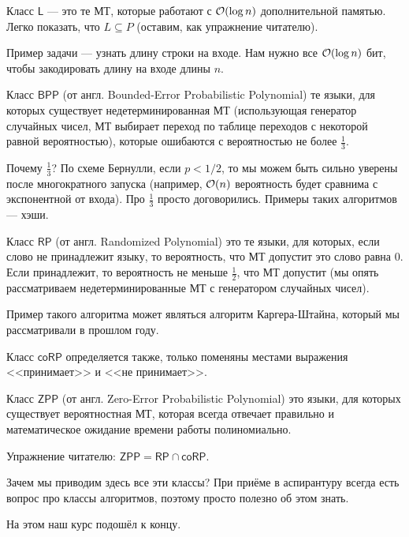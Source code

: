 \documentclass[a4paper, 12pt]{article}
\begin{document}
\begin{Def}
  Класс $\mathsf{L}$ --- это те МТ, которые работают с $\mathcal{O}(\log n)$ дополнительной
  памятью. Легко показать, что $L \subseteq P$ (оставим, как упражнение читателю).
\end{Def}

Пример задачи --- узнать длину строки на входе. Нам нужно все $\mathcal{O}(\log n)$ бит, 
чтобы закодировать длину на входе длины $n$.

\begin{Def}
  Класс $\mathsf{BPP}$ (от англ. Bounded-Error Probabilistic Polynomial) те языки,
  для которых существует
  недетерминированная МТ (использующая генератор случайных чисел, МТ выбирает
  переход по таблице переходов с некоторой равной вероятностью),
  которые ошибаются с вероятностью не более $\frac{1}{3}$.
\end{Def}

Почему $\frac{1}{3}$? По схеме Бернулли, если $p < 1/2$, то мы можем
быть сильно уверены после многократного запуска (например, $\mathcal{O}(n)$ вероятность
будет сравнима с экспонентной от входа). Про
$\frac{1}{3}$ просто договорились. Примеры таких алгоритмов --- хэши.

\begin{Def}
  Класс $\mathsf{RP}$ (от англ. Randomized Polynomial) это те языки, для которых,
  если слово не принадлежит языку, то вероятность, что МТ допустит это слово
  равна 0. Если принадлежит, то вероятность не меньше $\frac{1}{2}$, что МТ
  допустит (мы опять рассматриваем недетерминированные МТ с генератором случайных
  чисел).
\end{Def}

Пример такого алгоритма может являться алгоритм Каргера-Штайна, который мы
рассматривали в прошлом году.

Класс $\mathsf{coRP}$ определяется также, только поменяны местами выражения
<<принимает>> и <<не принимает>>.

\begin{Def}
  Класс $\mathsf{ZPP}$ (от англ. Zero-Error Probabilistic Polynomial) это
  языки, для которых существует вероятностная МТ, которая всегда отвечает
  правильно и математическое ожидание времени работы полиномиально.
\end{Def}

Упражнение читателю: $\mathsf{ZPP} = \mathsf{RP} \cap \mathsf{coRP}$.

Зачем мы приводим здесь все эти классы? При приёме в аспирантуру всегда
есть вопрос про классы алгоритмов, поэтому просто полезно об этом знать.


На этом наш курс подошёл к концу.
\end{document}
